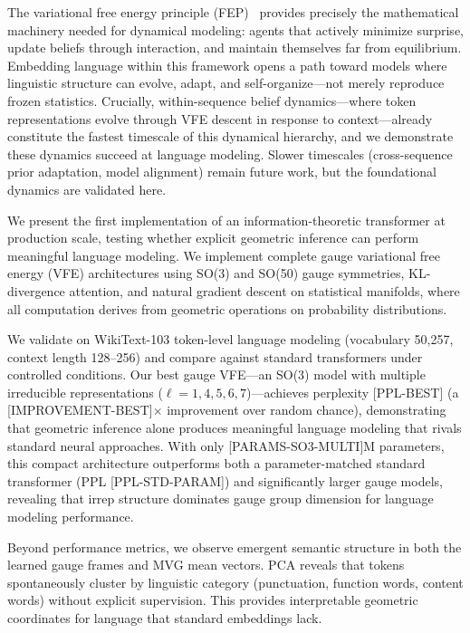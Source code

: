 \documentclass[twoside,11pt]{article}
\begin{document}
The variational free energy principle (FEP)~\citep{friston2010free} provides precisely the mathematical machinery needed for dynamical modeling: agents that actively minimize surprise, update beliefs through interaction, and maintain themselves far from equilibrium. Embedding language within this framework opens a path toward models where linguistic structure can evolve, adapt, and self-organize---not merely reproduce frozen statistics. Crucially, within-sequence belief dynamics---where token representations evolve through VFE descent in response to context---already constitute the fastest timescale of this dynamical hierarchy, and we demonstrate these dynamics succeed at language modeling. Slower timescales (cross-sequence prior adaptation, model alignment) remain future work, but the foundational dynamics are validated here.

We present the first implementation of an information-theoretic transformer at production scale, testing whether explicit geometric inference can perform meaningful language modeling. We implement complete gauge variational free energy (VFE) architectures using SO(3) and SO(50) gauge symmetries, KL-divergence attention, and natural gradient descent on statistical manifolds, where all computation derives from geometric operations on probability distributions.

We validate on WikiText-103 token-level language modeling (vocabulary 50,257, context length 128--256) and compare against standard transformers under controlled conditions. Our best gauge VFE---an SO(3) model with multiple irreducible representations ($\ell=1,4,5,6,7$)---achieves perplexity [PPL-BEST] (a [IMPROVEMENT-BEST]$\times$ improvement over random chance), demonstrating that geometric inference alone produces meaningful language modeling that rivals standard neural approaches. With only [PARAMS-SO3-MULTI]M parameters, this compact architecture outperforms both a parameter-matched standard transformer (PPL [PPL-STD-PARAM]) and significantly larger gauge models, revealing that irrep structure dominates gauge group dimension for language modeling performance.

Beyond performance metrics, we observe emergent semantic structure in both the learned gauge frames and MVG mean vectors.  PCA reveals that tokens spontaneously cluster by linguistic category (punctuation, function words, content words) without explicit supervision. This provides interpretable geometric coordinates for language that standard embeddings lack. 
\end{document}
